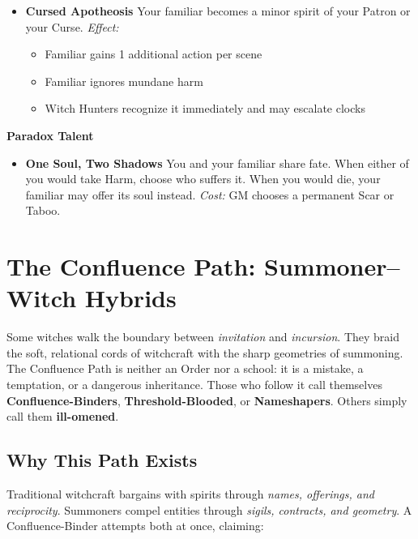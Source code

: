 \documentclass[11pt]{book}
\begin{document}
\begin{tcolorbox}[colback=shadowpurple!5,colframe=shadowpurple!80!black,
title={\textbf{The Marked Bond} --- Talents for Cursed Familiars}]
\begin{itemize}[noitemsep,leftmargin=1.5em]
    \item \textbf{Cursed Apotheosis}  
    Your familiar becomes a minor spirit of your Patron or your Curse.  
    \emph{Effect:}  
    \begin{itemize}
        \item Familiar gains 1 additional action per scene  
        \item Familiar ignores mundane harm  
        \item Witch Hunters recognize it immediately and may escalate clocks
    \end{itemize}
\end{itemize}

\vspace{0.5em}

\textbf{Paradox Talent}

\begin{itemize}[noitemsep,leftmargin=1.5em]
    \item \textbf{One Soul, Two Shadows}  
    You and your familiar share fate.  
    When either of you would take Harm, choose who suffers it.  
    When you would die, your familiar may offer its soul instead.  
    \emph{Cost:} GM chooses a permanent Scar or Taboo.
\end{itemize}

\end{tcolorbox}

\Appendix
\section*{The Confluence Path: Summoner--Witch Hybrids}
\label{hybrids:confluence}

Some witches walk the boundary between \emph{invitation} and \emph{incursion}.  
They braid the soft, relational cords of witchcraft with the sharp geometries of summoning.  
The Confluence Path is neither an Order nor a school: it is a mistake, a temptation, or a  
dangerous inheritance. Those who follow it call themselves \textbf{Confluence-Binders},  
\textbf{Threshold-Blooded}, or \textbf{Nameshapers}. Others simply call them \textbf{ill-omened}.

\subsection*{Why This Path Exists}
Traditional witchcraft bargains with spirits through \emph{names, offerings, and reciprocity}.  
Summoners compel entities through \emph{sigils, contracts, and geometry}.  
A Confluence-Binder attempts both at once, claiming:
\end{document}
